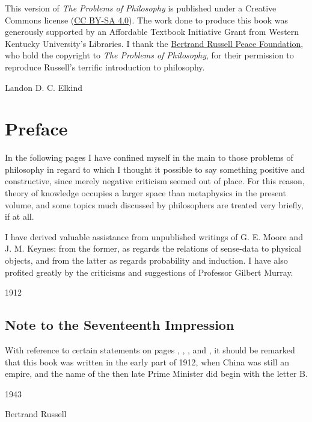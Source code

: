 \documentclass[oneside,letterpaper,12pt]{book}
\begin{document}
This version of \emph{The Problems of Philosophy} is published under a Creative Commons license (\href{https://creativecommons.org/licenses/by-sa/4.0/}{CC BY-SA 4.0}). The work done to produce this book was generously supported by an Affordable Textbook Initiative Grant from Western Kentucky University's Libraries. I thank the \href{http://www.russfound.org/}{Bertrand Russell Peace Foundation}, who hold the copyright to \emph{The Problems of Philosophy}, for their permission to reproduce Russell's terrific introduction to philosophy.

\begin{flushright}
	Landon D. C. Elkind
\end{flushright} 

\hypertarget{preface}{%
	\chapter*{Preface}\label{preface}}

In the following pages I have confined myself in the main to those
problems of philosophy in regard to which I thought it possible to say
something positive and constructive, since merely negative criticism
seemed out of place. For this reason, theory of knowledge occupies a
larger space than metaphysics in the present volume, and some topics
much discussed by philosophers are treated very briefly, if at all.

I have derived valuable assistance from unpublished writings of G. E.
Moore and J. M. Keynes: from the former, as regards the relations of
sense-data to physical objects, and from the latter as regards
probability and induction. I have also profited greatly by the
criticisms and suggestions of Professor Gilbert Murray.

\bigskip 

1912

\section*{Note to the Seventeenth Impression}

With reference to certain 
statements on pages \pageref{China1}, \pageref{China2}, \pageref{Balfour1}, 
and \pageref{Balfour2}, it should be remarked that this book was 
written in the early part of 1912, when China was still an empire, and 
the name of the then late Prime Minister did begin with the letter B.

\bigskip

1943 
\begin{flushright}
	Bertrand Russell
\end{flushright} 
\end{document}
